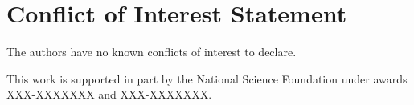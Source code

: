 \documentclass[manuscript,screen,review]{acmart}
\begin{document}
\section*{Conflict of Interest Statement}
The authors have no known conflicts of interest to declare. 

\begin{acks} 
This work is supported in part by the National Science Foundation under awards XXX-XXXXXXX and XXX-XXXXXXX.
\end{acks}




\appendix


\end{document}
